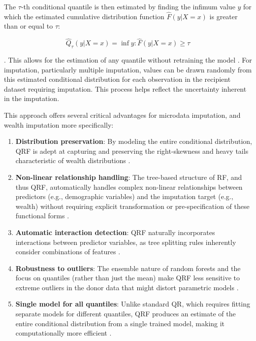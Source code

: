 The $\tau$-th conditional quantile is then estimated by finding the infimum value $y$ for which the estimated cumulative distribution function $\hat{F}(y|X=x)$ is greater than or equal to $\tau$:

$$\hat{Q}_\tau(y|X=x) = \inf{y: \hat{F}(y|X=x) \geq \tau}$$

\citep{meinshausen2006quantile}. This allows for the estimation of any quantile without retraining the model \citep{woodruff2024enhancing}. For imputation, particularly multiple imputation, values can be drawn randomly from this estimated conditional distribution for each observation in the recipient dataset requiring imputation. This process helps reflect the uncertainty inherent in the imputation.

This approach offers several critical advantages for microdata imputation, and wealth imputation more specifically:

\begin{enumerate}
    \item \textbf{Distribution preservation}: By modeling the entire conditional distribution, QRF is adept at capturing and preserving the right-skewness and heavy tails characteristic of wealth distributions \citep{meinshausen2006quantile}. 

    \item \textbf{Non-linear relationship handling}: The tree-based structure of RF, and thus QRF, automatically handles complex non-linear relationships between predictors (e.g., demographic variables) and the imputation target (e.g., wealth) without requiring explicit transformation or pre-specification of these functional forms \citep{tang2017random}.

    \item \textbf{Automatic interaction detection}: QRF naturally incorporates interactions between predictor variables, as tree splitting rules inherently consider combinations of features \citep{tang2017random}.

    \item \textbf{Robustness to outliers}:  The ensemble nature of random forests and the focus on quantiles (rather than just the mean) make QRF less sensitive to extreme outliers in the donor data that might distort parametric models \citep{learneconometricsfast2025quantile}.

    \item \textbf{Single model for all quantiles}: Unlike standard QR, which requires fitting separate models for different quantiles, QRF produces an estimate of the entire conditional distribution from a single trained model, making it computationally more efficient \citep{meinshausen2006quantile}.
\end{enumerate}

